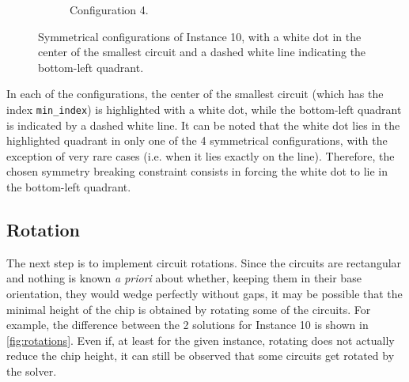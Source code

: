 \documentclass[a4paper, 12pt]{article}
\begin{document}
\begin{figure}
\begin{subfigure}[t]{0.45\textwidth}
        \caption{Configuration 4.}
    \end{subfigure}
    \caption[Symmetrical configurations.]{Symmetrical configurations of Instance 10, with a white dot in the center of the smallest circuit and a dashed white line indicating the bottom-left quadrant.}
    \label{fig:solutions}
\end{figure}

In each of the configurations, the center of the smallest circuit (which has the index \verb|min_index|) is highlighted with a white dot, while the bottom-left quadrant is indicated by a dashed white line. It can be noted that the white dot lies in the highlighted quadrant in only one of the 4 symmetrical configurations, with the exception of very rare cases (i.e. when it lies exactly on the line). Therefore, the chosen symmetry breaking constraint consists in forcing the white dot to lie in the bottom-left quadrant.


\subsection{Rotation}

The next step is to implement circuit rotations. Since the circuits are rectangular and nothing is known \emph{a priori} about whether, keeping them in their base orientation, they would wedge perfectly without gaps, it may be possible that the minimal height of the chip is obtained by rotating some of the circuits. For example, the difference between the 2 solutions for Instance 10 is shown in \cref{fig:rotations}. Even if, at least for the given instance, rotating does not actually reduce the chip height, it can still be observed that some circuits get rotated by the solver.
\end{document}
